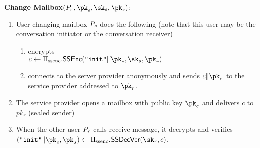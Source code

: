 \smallskip \noindent
\textbf{ Change Mailbox}$(P_r, \pk_e, \sk_s, \pk_r)$:
\begin{enumerate}[noitemsep]
  \item User changing mailbox $P_s$ does the following (note that this user may be the conversation initiator or the conversation receiver)
  \begin{enumerate}[noitemsep]
  \item encrypts \\ $c \leftarrow \sealedsenderencryptionscheme.\sealedsenderencryptionenc(\texttt{``init''} \| \pk_e, \sk_s, \pk_r)$
  \item connects to the server provider anonymously and sends $c \| \pk_e$ to the service provider addressed to $\pk_r$.
  \end{enumerate}
  
  \item The service provider opens a mailbox with public key $\pk_e$ and delivers $c$ to $pk_r$ (sealed sender) 
    
  \item When the other user $P_r$ calls receive message, it decrypts and verifies \\$(\texttt{``init''} \| \pk_e, \pk_s) \leftarrow \sealedsenderencryptionscheme.\sealedsenderencryptionvdec(\sk_r, c)$.
\end{enumerate}



